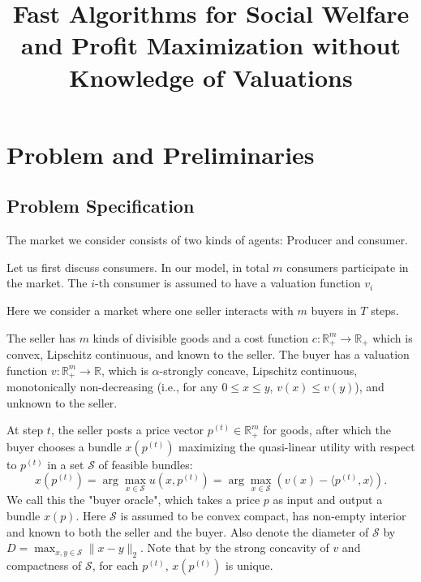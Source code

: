 \documentclass{article}
\author{}
\title{Fast Algorithms for Social Welfare and Profit Maximization without Knowledge of Valuations}
\begin{document}
\newcommand{\tbf}[1]{\textbf{#1}}
\newcommand{\bs}[1]{\boldsymbol{#1}}
\newcommand{\mr}[1]{\mathrm{#1}}
\newcommand{\mc}[1]{\mathcal{#1}}
\newcommand{\mbb}[1]{\mathbb{#1}}
\newcommand{\mbf}[1]{\mathbf{#1}}
\let\onlyif\Longleftarrow

\maketitle

\section{Problem and Preliminaries}
\subsection{Problem Specification}
The market we consider consists of two kinds of agents: Producer and consumer.

Let us first discuss consumers. In our model, in total $m$ consumers participate in the market. The $i$-th consumer is assumed to have a valuation function $v_i$

Here we consider a market where one seller interacts with $m$ buyers in $T$ steps.

The seller has $m$ kinds of divisible goods and a cost function $c:\mbb{R}_+^m\rightarrow\mbb{R}_+$ which is convex, Lipschitz continuous, and known to the seller. The buyer has a valuation function $v:\mbb{R}_+^m\rightarrow\mbb{R}$, which is $\alpha$-strongly concave, Lipschitz continuous, monotonically non-decreasing (i.e., for any $0\le x\le y$, $v(x)\le v(y)$), and unknown to the seller.

At step $t$, the seller posts a price vector $p^{(t)}\in \mathbb{R}_+^m$ for goods, after which the buyer chooses a bundle $x(p^{(t)})$ maximizing the quasi-linear utility with respect to $p^{(t)}$ in a set $\mathcal{S}$ of feasible bundles:
\begin{equation}
    x(p^{(t)})=\arg\max_{x\in \mathcal{S}}u(x,p^{(t)})=\arg\max_{x\in \mathcal{S}}(v(x)-\langle p^{(t)},x\rangle).
\end{equation}
We call this the "buyer oracle", which takes a price $p$ as input and output a bundle $x(p)$. Here $\mathcal{S}$ is assumed to be convex compact, has non-empty interior and known to both the seller and the buyer. Also denote the diameter of $\mathcal{S}$ by $D=\max_{x,y\in \mathcal{S}}\|x-y\|_2$. Note that by the strong concavity of $v$ and compactness of $\mathcal{S}$, for each $p^{(t)}$, $x(p^{(t)})$ is unique.
\end{document}
